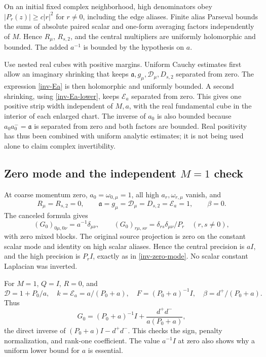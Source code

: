 On an initial fixed complex neighborhood, high denominators obey
$|P_r(z)|\ge c|r|^2$ for $r\ne0$, including the edge aliases.
Finite alias Parseval bounds the sums of absolute paired scalar and
one-form averaging factors independently of $M$. Hence $R_\mu$,
$R_{s,2}$, and the central multipliers are uniformly holomorphic and
bounded. The added $a^{-1}$ is bounded by the hypothesis on $a$.

Use nested real cubes with positive margins. Uniform Cauchy estimates
first allow an imaginary shrinking that keeps $\mathfrak a,g_\mu,
\mathcal D_\mu,D_{s,2}$ separated from zero. The expression
\eqref{inv-Ea} is then holomorphic and uniformly bounded. A second
shrinking, using \eqref{inv-Ea-lower}, keeps $\mathcal E_a$ separated
from zero. This gives one positive strip width independent of $M,a$,
with the real fundamental cube in the interior of each enlarged chart.
The inverse of $a_0$ is also bounded because $a_0a_0^-=\mathfrak a$
is separated from zero and both factors are bounded. Real positivity
has thus been combined with uniform analytic estimates; it is not
being used alone to claim complex invertibility.

\subsection{Zero mode and the independent $M=1$ check}

At coarse momentum zero, $a_0=\omega_{0,\mu}=1$, all high
$a_r,\omega_{r,\mu}$ vanish, and
\[
 R_\mu=R_{s,2}=0,\qquad
 \mathfrak a=g_\mu=\mathcal D_\mu=D_{s,2}=\mathcal E_a=1,
 \qquad\beta=0.
\]
The canceled formula gives
\begin{equation}\label{inv-zero-mode}
 (G_0)_{0\mu,0\nu}=a^{-1}\delta_{\mu\nu},\qquad
 (G_0)_{r\mu,s\nu}=\delta_{rs}\delta_{\mu\nu}/P_r
       \quad(r,s\ne0),
\end{equation}
with zero mixed blocks. The original source projection is zero on the
constant scalar mode and identity on high scalar aliases. Hence the
central precision is $aI$, and the high precision is $P_rI$, exactly
as in \eqref{inv-zero-mode}. No scalar constant Laplacian was inverted.

For $M=1$, $Q=I$, $R=0$, and
\[
 \mathcal D=1+P_0/a,\quad k=\mathcal E_a=a/(P_0+a),\quad
 F=(P_0+a)^{-1}I,\quad\beta=d^+/(P_0+a).
\]
Thus
\begin{equation}\label{inv-M1}
 G_0=(P_0+a)^{-1}I+\frac{d^+d^-}{a(P_0+a)},
\end{equation}
the direct inverse of $(P_0+a)I-d^+d^-$. This checks the sign,
penalty normalization, and rank-one coefficient. The value $a^{-1}I$
at zero also shows why a uniform lower bound for $a$ is essential.

